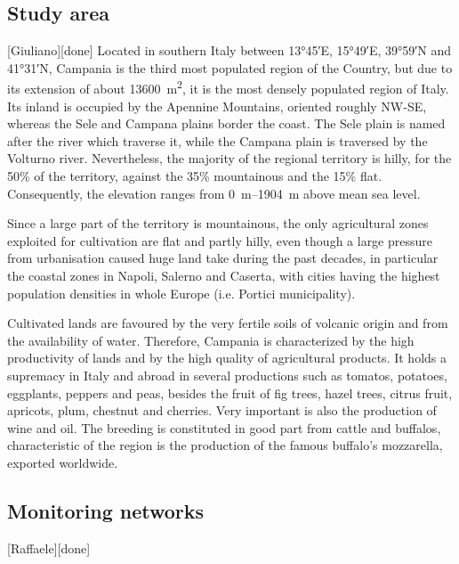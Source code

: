 \documentclass[authoryear,preprint,review,12pt]{elsarticle}
\newcommand{\update}[1]{\emph{\textcolor{blue}{#1}}}
\newcommand{\gci}{\update{AgriMetSupport}\xspace}
\begin{document}
\subsection{Study area}[Giuliano][done]
Located in southern Italy between \ang{13;45;}E, \ang{15;49;}E, \ang{39;59;}N and \ang{41;31;}N, Campania is the third most populated region of the Country, but due to its extension of about \SI{13600}{\metre\squared}, it is the most densely populated region of Italy.
Its inland is occupied by the Apennine Mountains, oriented roughly NW-SE, whereas the Sele and Campana plains border the coast.
The Sele plain is named after the river which traverse it, while the Campana plain is traversed by the Volturno river.
Nevertheless, the majority of the regional territory is hilly, for the 50\% of the territory, against the 35\% mountainous and the 15\% flat.
Consequently, the elevation ranges from \SIrange{0}{1904}{\metre} above mean sea level.

Since a large part of the territory is mountainous, the only agricultural zones exploited for cultivation are flat and partly hilly, even though a large pressure from urbanisation caused huge land take during the past decades, in particular  the coastal zones in Napoli, Salerno and Caserta, with cities having the highest population densities in whole Europe (i.e. Portici municipality).

Cultivated lands are favoured by the very fertile soils of volcanic origin and from the availability of water. 
Therefore, Campania is characterized by the high productivity of lands and by the high quality of agricultural products.
It holds a supremacy in Italy and abroad in several productions such as tomatos, potatoes, eggplants, peppers and peas, besides the fruit of fig trees, hazel trees, citrus fruit, apricots, plum, chestnut and cherries.
Very important is also the production of wine and oil.
The breeding is constituted in good part from cattle and buffalos, characteristic of the region is the production of the famous buffalo's mozzarella, exported worldwide.


\subsection{Monitoring networks %
}[Raffaele][done]
\end{document}
